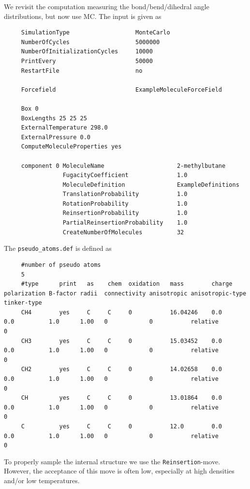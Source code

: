 We revisit the computation measuring the bond/bend/dihedral angle distributions, but now use MC.
The input is given as
\begin{tiny}
\begin{verbatim}
     SimulationType                   MonteCarlo
     NumberOfCycles                   5000000
     NumberOfInitializationCycles     10000
     PrintEvery                       50000
     RestartFile                      no
     
     Forcefield                       ExampleMoleculeForceField
     
     Box 0
     BoxLengths 25 25 25
     ExternalTemperature 298.0
     ExternalPressure 0.0
     ComputeMoleculeProperties yes
     
     component 0 MoleculeName                     2-methylbutane
                 FugacityCoefficient              1.0
                 MoleculeDefinition               ExampleDefinitions
                 TranslationProbability           1.0
                 RotationProbability              1.0
                 ReinsertionProbability           1.0
                 PartialReinsertionProbability    1.0
                 CreateNumberOfMolecules          32
\end{verbatim}
\end{tiny}
The \verb+pseudo_atoms.def+ is defined as
\begin{tiny}
\begin{verbatim}
     #number of pseudo atoms
     5
     #type      print   as    chem  oxidation   mass        charge   polarization B-factor radii  connectivity anisotropic anisotropic-type   tinker-type
     CH4        yes     C     C     0           16.04246    0.0      0.0          1.0      1.00   0            0           relative           0
     CH3        yes     C     C     0           15.03452    0.0      0.0          1.0      1.00   0            0           relative           0
     CH2        yes     C     C     0           14.02658    0.0      0.0          1.0      1.00   0            0           relative           0
     CH         yes     C     C     0           13.01864    0.0      0.0          1.0      1.00   0            0           relative           0
     C          yes     C     C     0           12.0        0.0      0.0          1.0      1.00   0            0           relative           0
\end{verbatim}
\end{tiny}
To properly sample the internal structure we use the \verb+Reinsertion+-move.
However, the acceptance of this move is often low, especially at high densities and/or low temperatures.
